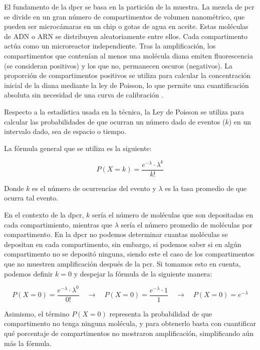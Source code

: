 \documentclass{AsignaturaResumen}
\begin{document}
El fundamento de la \acrshort{dpcr} se basa en la partición de la muestra. La mezcla de \acrshort{pcr} se divide en un gran número de compartimentos de volumen nanométrico, que pueden ser microcámaras en un chip o gotas de agua en aceite. Estas moléculas de ADN o ARN se distribuyen aleatoriamente entre ellos. Cada compartimento actúa como un microreactor independiente. Tras la amplificación, los compartimentos que contenían al menos una molécula diana emiten fluorescencia (se consideran positivos) y los que no, permanecen oscuros (negativos). La proporción de compartimentos positivos se utiliza para calcular la concentración inicial de la diana mediante la ley de Poisson, lo que permite una cuantificación absoluta sin necesidad de una curva de calibración \citep{maoPrinciplesDigitalPCR2019}.

Respecto a la estadística usada en la técnica, la Ley de Poisson se utiliza para calcular las probabilidades de que ocurran un número dado de eventos ($k$) en un intervalo dado, sea de espacio o tiempo. 

La fórmula general que se utiliza es la siguiente:

\begin{equation*}
    P(X=k) = \frac{e^{-\lambda} \cdot \lambda^{k}}{k!}
\end{equation*}  

Donde $k$ es el número de ocurrencias del evento y $\lambda$ es la tasa promedio de que ocurra tal evento. 

En el contexto de la \acrshort{dpcr}, $k$ sería el número de moléculas que son depositadas en cada compartimiento, mientras que $\lambda$ sería el número promedio de moléculas por compartimento. En la \acrshort{dpcr} no podemos determinar cuantas moléculas se depositan en cada compartimento, sin embargo, si podemos saber si en algún compartimento no se depositó ninguna, siendo este el caso de los compartimentos que no muestren amplificación después de la \acrshort{pcr}. Si tomamos esto en cuenta, podemos definir $k = 0$ y despejar la fórmula de la siguiente manera:

\begin{equation*}
    P(X=0)=\frac{e^{-\lambda}\cdot\lambda^{0}}{0!} \quad\longrightarrow\quad P(X=0)=\frac{e^{-\lambda}\cdot 1}{1} \quad\longrightarrow\quad P(X=0) = e^{-\lambda}
\end{equation*}

Asimismo, el término $P(X=0)$ representa la probabilidad de que compartimento no tenga ninguna molécula, y para obtenerlo basta con cuantificar qué porcentaje de compartimentos no mostraron amplificación, simplificando aún más la fórmula.
\end{document}
